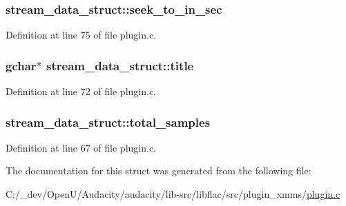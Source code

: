 \subsubsection[{\texorpdfstring{seek\+\_\+to\+\_\+in\+\_\+sec}{seek_to_in_sec}}]{ stream\+\_\+data\+\_\+struct\+::seek\+\_\+to\+\_\+in\+\_\+sec}\hypertarget{structstream__data__struct_a82d947588a2803072a02951adc2ec603}{}\label{structstream__data__struct_a82d947588a2803072a02951adc2ec603}


Definition at line 75 of file plugin.\+c.

\subsubsection[{\texorpdfstring{title}{title}}]{\setlength{\rightskip}{0pt plus 5cm}gchar$\ast$ stream\+\_\+data\+\_\+struct\+::title}\hypertarget{structstream__data__struct_a9462e9113421cec64e9c5b966f4794ff}{}\label{structstream__data__struct_a9462e9113421cec64e9c5b966f4794ff}


Definition at line 72 of file plugin.\+c.

\subsubsection[{\texorpdfstring{total\+\_\+samples}{total_samples}}]{ stream\+\_\+data\+\_\+struct\+::total\+\_\+samples}\hypertarget{structstream__data__struct_adf1b0c5fcc786097d2f1b50230d44156}{}\label{structstream__data__struct_adf1b0c5fcc786097d2f1b50230d44156}


Definition at line 67 of file plugin.\+c.



The documentation for this struct was generated from the following file\+:\begin{DoxyCompactItemize}
\item 
C\+:/\+\_\+dev/\+Open\+U/\+Audacity/audacity/lib-\/src/libflac/src/plugin\+\_\+xmms/\hyperlink{libflac_2src_2plugin__xmms_2plugin_8c}{plugin.\+c}\end{DoxyCompactItemize}
